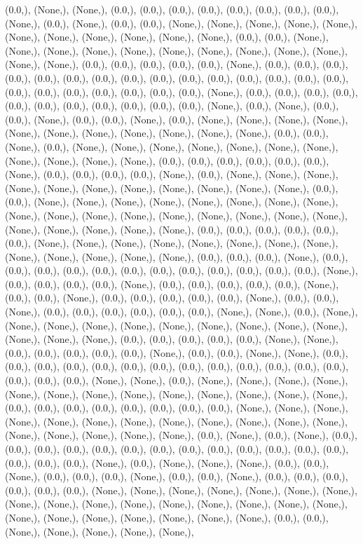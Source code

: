 \documentclass{article}
\begin{document}
(0.0,), (None,), (None,), (0.0,), (0.0,), (0.0,), (0.0,), (0.0,), (0.0,), (0.0,), (0.0,), (None,), (0.0,), (None,), (0.0,), (0.0,), (None,), (None,), (None,), (None,), (None,), (None,), (None,), (None,), (None,), (None,), (None,), (0.0,), (0.0,), (None,), (None,), (None,), (None,), (None,), (None,), (None,), (None,), (None,), (None,), (None,), (None,), (0.0,), (0.0,), (0.0,), (0.0,), (0.0,), (None,), (0.0,), (0.0,), (0.0,), (0.0,), (0.0,), (0.0,), (0.0,), (0.0,), (0.0,), (0.0,), (0.0,), (0.0,), (0.0,), (0.0,), (0.0,), (0.0,), (0.0,), (0.0,), (0.0,), (0.0,), (0.0,), (0.0,), (None,), (0.0,), (0.0,), (0.0,), (0.0,), (0.0,), (0.0,), (0.0,), (0.0,), (0.0,), (0.0,), (0.0,), (None,), (0.0,), (None,), (0.0,), (0.0,), (None,), (0.0,), (0.0,), (None,), (0.0,), (None,), (None,), (None,), (None,), (None,), (None,), (None,), (None,), (None,), (None,), (None,), (0.0,), (0.0,), (None,), (0.0,), (None,), (None,), (None,), (None,), (None,), (None,), (None,), (None,), (None,), (None,), (None,), (0.0,), (0.0,), (0.0,), (0.0,), (0.0,), (0.0,), (None,), (0.0,), (0.0,), (0.0,), (0.0,), (None,), (0.0,), (None,), (None,), (None,), (None,), (None,), (None,), (None,), (None,), (None,), (None,), (None,), (0.0,), (0.0,), (None,), (None,), (None,), (None,), (None,), (None,), (None,), (None,), (None,), (None,), (None,), (None,), (None,), (None,), (None,), (None,), (None,), (None,), (None,), (None,), (None,), (None,), (0.0,), (0.0,), (0.0,), (0.0,), (0.0,), (0.0,), (None,), (None,), (None,), (None,), (None,), (None,), (None,), (None,), (None,), (None,), (None,), (None,), (None,), (0.0,), (0.0,), (0.0,), (None,), (0.0,), (0.0,), (0.0,), (0.0,), (0.0,), (0.0,), (0.0,), (0.0,), (0.0,), (0.0,), (0.0,), (0.0,), (None,), (0.0,), (0.0,), (0.0,), (0.0,), (None,), (0.0,), (0.0,), (0.0,), (0.0,), (0.0,), (None,), (0.0,), (0.0,), (None,), (0.0,), (0.0,), (0.0,), (0.0,), (0.0,), (None,), (0.0,), (0.0,), (None,), (0.0,), (0.0,), (0.0,), (0.0,), (0.0,), (0.0,), (None,), (None,), (0.0,), (None,), (None,), (None,), (None,), (None,), (None,), (None,), (None,), (None,), (None,), (None,), (None,), (None,), (0.0,), (0.0,), (0.0,), (0.0,), (0.0,), (None,), (None,), (0.0,), (0.0,), (0.0,), (0.0,), (0.0,), (None,), (0.0,), (0.0,), (None,), (None,), (0.0,), (0.0,), (0.0,), (0.0,), (0.0,), (0.0,), (0.0,), (0.0,), (0.0,), (0.0,), (0.0,), (0.0,), (0.0,), (0.0,), (0.0,), (0.0,), (None,), (None,), (0.0,), (None,), (None,), (None,), (None,), (None,), (None,), (None,), (None,), (None,), (None,), (None,), (None,), (None,), (0.0,), (0.0,), (0.0,), (0.0,), (0.0,), (0.0,), (0.0,), (0.0,), (None,), (None,), (None,), (None,), (None,), (None,), (None,), (None,), (None,), (None,), (None,), (None,), (None,), (None,), (None,), (None,), (None,), (0.0,), (None,), (0.0,), (None,), (0.0,), (0.0,), (0.0,), (0.0,), (0.0,), (0.0,), (0.0,), (0.0,), (0.0,), (0.0,), (0.0,), (0.0,), (0.0,), (0.0,), (0.0,), (0.0,), (None,), (0.0,), (None,), (None,), (None,), (0.0,), (0.0,), (None,), (0.0,), (0.0,), (0.0,), (None,), (0.0,), (0.0,), (None,), (0.0,), (0.0,), (0.0,), (0.0,), (0.0,), (0.0,), (None,), (None,), (None,), (None,), (None,), (None,), (None,), (None,), (None,), (None,), (None,), (None,), (None,), (None,), (None,), (None,), (None,), (None,), (None,), (None,), (None,), (None,), (None,), (0.0,), (0.0,), (None,), (None,), (None,), (None,), (None,), 
\end{document}
